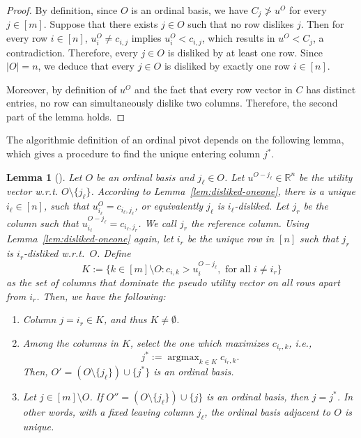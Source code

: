 \documentclass[11pt]{article}
\newtheorem{lemma}[theorem]{Lemma}
\begin{document}
\begin{proof}
    By definition, since $O$ is an ordinal basis, we have $C_j\ngtr u^O$ for every $j\in[m]$. Suppose that there exists $j\in O$ such that no row dislikes $j$. Then for every row $i\in[n]$, $u^O_i\neq c_{i,j}$ implies $u^O_i<c_{i,j}$, which results in $u^O<C_j$, a contradiction. Therefore, every $j\in O$ is disliked by at least one row. Since $|O|=n$, we deduce that every $j\in O$ is disliked by exactly one row $i\in [n]$. 

    Moreover, by definition of $u^O$ and the fact that every row vector in $C$ has distinct entries, no row can simultaneously dislike two columns. Therefore, the second part of the lemma holds.
\end{proof}


The algorithmic definition of an ordinal pivot depends on the following lemma, which gives a procedure to find the unique  entering column $j^*$.

\begin{lemma}[\cite{scarf1967core}]\label{lem:op-def}
    Let $O$ be an ordinal basis and $j_\ell\in O$. Let $u^{O-j_\ell}\in\mathbb{R}^n$ be the utility vector w.r.t. $O\setminus\{j_\ell\}$. According to
Lemma~\ref{lem:disliked-oneone}, there is a unique $i_\ell\in[n]$, such that $u_{i_\ell}^O=c_{i_\ell,j_\ell}$, or equivalently $j_\ell$ is $i_\ell$-disliked. 
Let $j_r$ be the column such that $u^{O-j_\ell}_{i_\ell}=c_{i_\ell,j_r}$. We call $j_r$ the \emph{reference column}. Using Lemma~\ref{lem:disliked-oneone} again, let $i_r$ be the unique row in $[n]$ such that $j_r$ is $i_r$-disliked w.r.t.~$O$. Define
\begin{equation}\label{eq:appchoiceoford}
    K:=\{k\in[m]\setminus O:c_{i,k}>u^{O-j_\ell}_i, \textrm{ for all } i\neq i_r\}
\end{equation}
as the set of columns that dominate the pseudo utility vector on all rows apart from $i_r$. Then, we have the following: 
\begin{enumerate}
    \item Column $j=i_r\in K$, and thus $K\neq\emptyset$.
    \item Among the columns in $K$, select the one which maximizes $c_{i_r,k}$, i.e.,
    $$j^*:=\mathop{\arg\max}_{k\in K} c_{i_r, k}.$$
    Then, $O'=(O\setminus\{j_\ell\})\cup\{j^*\}$ is an ordinal basis.
    \item Let $j\in[m]\setminus O$. If $O''=(O\setminus\{j_\ell\})\cup\{j\}$ is an ordinal basis, then $j=j^*$. In other words, with a fixed leaving column $j_\ell$, the ordinal basis adjacent to $O$ is unique.
\end{enumerate}
\end{lemma}
\end{document}
